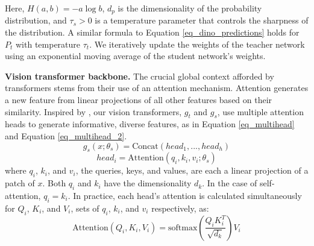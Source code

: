 \documentclass[letterpaper, 11pt]{IEEEtran}
\begin{document}
\noindent 
Here, $H(a,b) =-a\log b$, $d_p$ is the dimensionality of the probability distribution, and
$\tau_{s} > 0$ is a temperature parameter that controls the sharpness of the distribution. 
A similar formula to Equation \ref{eq_dino_predictions} holds for $P_{t}$ with temperature $\tau_{t}$.
We iteratively update the weights of the teacher network using an exponential moving average of the student network's weights.

\textbf{Vision transformer backbone.}
The crucial global context afforded by transformers stems from their use of an attention mechanism. Attention generates a new feature from linear projections of all other features based on their similarity.
Inspired by \citet{vaswani2017attention}, our vision transformers, $g_{t}$ and $g_{s}$, use multiple attention heads to generate informative, diverse features, as in Equation \ref{eq_multihead} and Equation \ref{eq_multihead_2}.
\begin{equation}
\label{eq_multihead}
    g_s(x; \theta_s) = \text{Concat}(head_1, ..., head_h)
\end{equation}
\begin{equation}
\label{eq_multihead_2}
    head_i =  \text{Attention}(q_i,k_i,v_i; \theta_{s})
\end{equation}
where $q_i$, $k_i$, and $v_i$, the queries, keys, and values, are each a linear projection of a patch of $x$. 
Both $q_i$ and $k_i$ have the dimensionality $d_k$. In the case of self-attention, $q_i = k_i$.
In practice, each head's attention is calculated simultaneously for $Q_i$, $K_i$, and $V_i$, sets of $q_i$, $k_i$, and $v_i$ respectively, as:
\begin{equation}
\label{eq_attention}
    \text{Attention}(Q_i,K_i,V_i) = \text{softmax}(\frac{Q_iK_i^T}{\sqrt{d_k}})V_i 
\end{equation}
\end{document}
